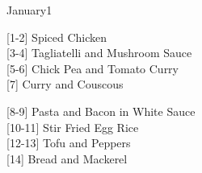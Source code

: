 
    
		\begin{menu}{January1}
    
    \begin{recipelist}
    
        {\scriptsize[1-2]} Spiced Chicken\\
        {\scriptsize[3-4]} Tagliatelli and Mushroom Sauce\\
        {\scriptsize[5-6]} Chick Pea and Tomato Curry\\
        {\scriptsize[7]} Curry and Couscous\\%
    \end{recipelist}%
    \begin{recipelist}
    
        {\scriptsize[8-9]} Pasta and Bacon in White Sauce\\
        {\scriptsize[10-11]} Stir Fried Egg Rice\\
        {\scriptsize[12-13]} Tofu and Peppers\\
        {\scriptsize[14]} Bread and Mackerel\\%
    \end{recipelist}\par%
  

\end{menu}
